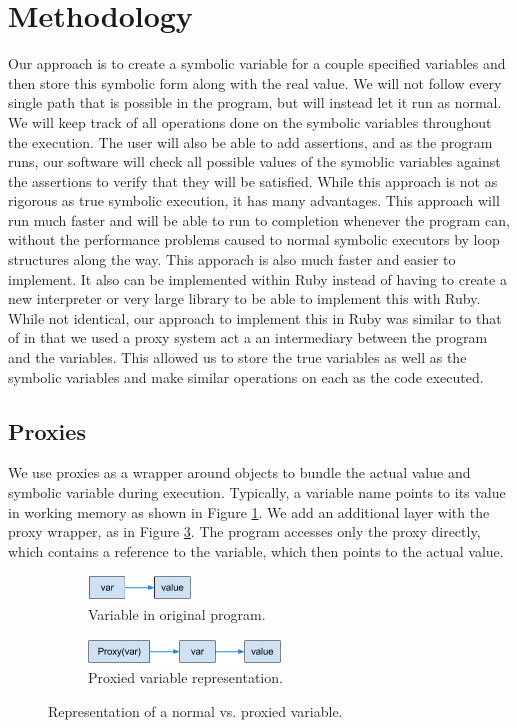 \documentclass[10pt]{article}
\begin{document}
\section{Methodology}
Our approach is to create a symbolic variable for a couple specified variables and then store this symbolic form along with the real value.  We will not follow every single path that is possible in the program, but will instead let it run as normal.  We will keep track of all operations done on the symbolic variables throughout the execution.  The user will also be able to add assertions, and as the program runs, our software will check all possible values of the symoblic variables against the assertions to verify that they will be satisfied.  While this approach is not as rigorous as true symbolic execution, it has many advantages.  This approach will run much faster and will be able to run to completion whenever the program can, without the performance problems caused to normal symbolic executors by loop structures along the way.  This apporach is also much faster and easier to implement.  It also can be implemented within Ruby instead of having to create a new interpreter or very large library to be able to implement this with Ruby.\\

While not identical, our approach to implement this in Ruby was similar to that of \cite{typeinf} in that we used a proxy system act a an intermediary between the program and the variables.  This allowed us to store the true variables as well as the symbolic variables and make similar operations on each as the code executed.\\


\subsection{Proxies}
We use proxies as a wrapper around objects to bundle the actual value and symbolic variable during execution.  Typically, a variable name points to its value in working memory as shown in Figure \ref{pointer:1}.  We add an additional layer with the proxy wrapper, as in Figure \ref{pointer:2}.  The program accesses only the proxy directly, which contains a reference to the variable, which then points to the actual value.

\begin{figure}
  \centering
  \begin{subfigure}{0.5\textwidth}
	\centering
	\includegraphics[height=25px]{pointer1.png}
	\caption{Variable in original program.}
	\label{pointer:1}
  \end{subfigure}\begin{subfigure}{0.5\textwidth}
	\centering
	\includegraphics[height=25px]{pointer2.png}
	\caption{Proxied variable representation.}
	\label{pointer:2}
  \end{subfigure}
  \caption{Representation of a normal vs. proxied variable.}
\end{figure}
\end{document}
